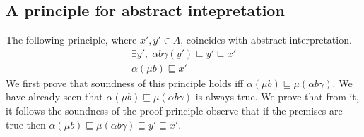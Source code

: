 \documentclass[smallcondensed,envcountsect,envcountsame]{svjour3}     %
\begin{document}
%
%
%

\subsection{A principle for abstract intepretation}


The following principle, where $x',y' \in A$, coincides with abstract interpretation.
\begin{equation}%
 \begin{array}{c}
    \exists y', \;  \alpha b \gamma(y') \sqsubseteq y'\sqsubseteq x' \\
    \hline %
    \alpha(\mu b) \sqsubseteq x'
\end{array}
\end{equation}
%
We first prove that soundness of this principle holds iff $\alpha(\mu b ) \sqsubseteq \mu (\alpha b \gamma )$. We have already seen that $\alpha(\mu b ) \sqsubseteq \mu (\alpha b \gamma )$ is always true. We prove that from it, it follows the soundness of the proof principle observe that if the premises are true then $\alpha(\mu b ) \sqsubseteq \mu (\alpha b \gamma ) \sqsubseteq y' \sqsubseteq x'$.  
\end{document}
